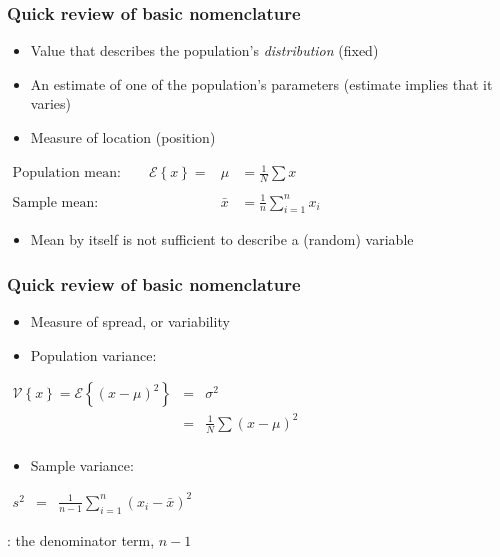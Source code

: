 \begin{frame}\frametitle{Quick review of basic nomenclature}
	{}
	\begin{itemize}
		\item	Value that describes the population's \emph{distribution} (fixed)
	\end{itemize}

	{}
	\begin{itemize}
		\item	An estimate of one of the population's parameters (estimate implies that it varies)
	\end{itemize}

	{}
	\begin{itemize}
		\item	Measure of location (position)
	\end{itemize}

	$
	\begin{array}{rcl}
		\text{Population mean:} \qquad \mathcal{E}\left\{x \right\} = &\mu &= \displaystyle \frac{1}{N}\sum{x} \\
		\\
		\text{Sample mean:} \qquad &\bar{x} &= \displaystyle \frac{1}{n}\sum_{i=1}^{n}{x_i}
	\end{array}
	$
	\begin{itemize}
		\item	Mean by itself is not sufficient to describe a (random) variable
	\end{itemize}
\end{frame}

\begin{frame}\frametitle{Quick review of basic nomenclature}
	{}
	\begin{itemize}
		\item	Measure of spread, or variability
		\item	Population variance:
	\end{itemize}

	$
	\begin{array}{rcl}
		\mathcal{V}\left\{x\right\} = \mathcal{E}\left\{ (x - \mu )^2\right\} &=& \sigma^2 \\
		&=& \displaystyle \frac{1}{N}\sum{(x-\mu)^2} \\
	\end{array}
	$
	\begin{itemize}
		\item	Sample variance:
	\end{itemize}
	$
	\begin{array}{rcl}
		s^2 &=& \displaystyle \frac{1}{n-1}\sum_{i=1}^{n}{(x_i - \bar{x})^2}
	\end{array}
	$

	{}: the denominator term, $n-1$
\end{frame}

